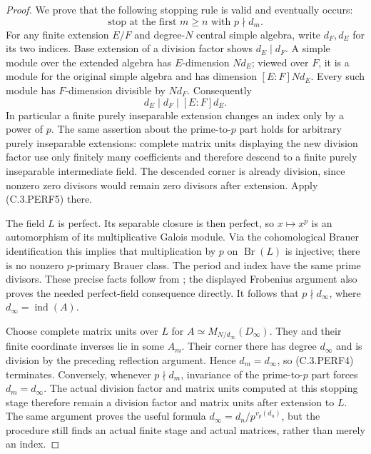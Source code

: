 \begin{proof}
We prove that the following stopping rule is valid and eventually
occurs:
\[
              \text{stop at the first }m\ge n
                         \text{ with }p\nmid d_m.       \tag{C.3.PERF4}
\]
For any finite extension $E/F$ and degree-$N$ central simple algebra,
write $d_F,d_E$ for its two indices.  Base extension of a division
factor shows $d_E\mid d_F$.  A simple module over the extended
algebra has $E$-dimension $Nd_E$; viewed over $F$, it is a module
for the original simple algebra and has dimension $[E:F]Nd_E$.
Every such module has $F$-dimension divisible by $Nd_F$.
Consequently
\[
                   d_E\mid d_F\mid [E:F]d_E.            \tag{C.3.PERF5}
\]
In particular a finite purely inseparable extension changes an
index only by a power of $p$.
The same assertion about the prime-to-$p$ part holds for arbitrary
purely inseparable extensions: complete matrix units displaying the
new division factor use only finitely many coefficients and therefore
descend to a finite purely inseparable intermediate field.  The
descended corner is already division, since nonzero zero divisors
would remain zero divisors after extension.  Apply (C.3.PERF5) there.

The field $L$ is perfect.  Its separable closure is then perfect,
so $x\mapsto x^p$ is an automorphism of its multiplicative Galois
module.  Via the cohomological Brauer identification this implies
that multiplication by $p$ on $\operatorname{Br}(L)$ is injective;
there is no nonzero $p$-primary Brauer class.  The period and index
have the same prime divisors.  These precise facts follow from
\cite[Theorem 4.4.7 and Proposition 4.5.13, pp.99,104--105]
{C-GilleSzamuelyPerfection2006}; the displayed Frobenius argument
also proves the needed perfect-field consequence directly.
It follows that $p\nmid d_\infty$, where
$d_\infty=\operatorname{ind}(A)$.

Choose complete matrix units over $L$ for
$A\simeq M_{N/d_\infty}(D_\infty)$.  They and their finite
coordinate inverses lie in some $A_m$.  Their corner there has
degree $d_\infty$ and is division by the preceding reflection
argument.  Hence $d_m=d_\infty$, so (C.3.PERF4) terminates.
Conversely, whenever $p\nmid d_m$, invariance of the prime-to-$p$
part forces $d_m=d_\infty$.  The actual division factor and matrix
units computed at this stopping stage therefore remain a division
factor and matrix units after extension to $L$.
The same argument proves the useful formula
$d_\infty=d_n/p^{v_p(d_n)}$, but the procedure still finds an
actual finite stage and actual matrices, rather than merely an index.


\end{proof}
